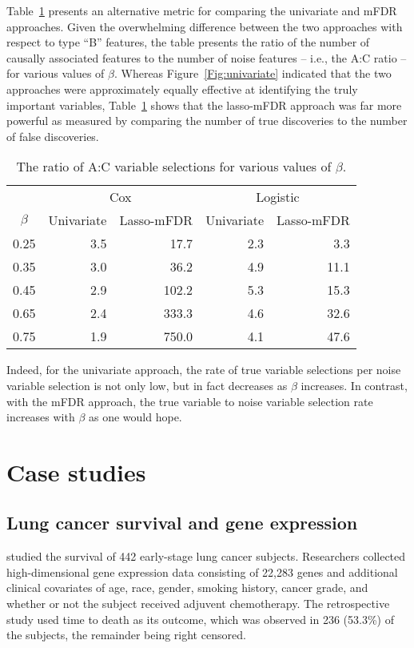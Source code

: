 Table~\ref{Tab:univariate} presents an alternative metric for comparing the univariate and mFDR approaches.  Given the overwhelming difference between the two approaches with respect to type ``B'' features, the table presents the ratio of the number of causally associated features to the number of noise features -- i.e., the A:C ratio -- for various values of $\beta$.  Whereas Figure~\ref{Fig:univariate} indicated that the two approaches were approximately equally effective at identifying the truly important variables, Table~\ref{Tab:univariate} shows that the lasso-mFDR approach was far more powerful as measured by comparing the number of true discoveries to the number of false discoveries.

\begin{table}[b!]
\centering
\begin{tabular}{c | r r r r}
  \hline
  & \multicolumn{2}{c}{Cox} & \multicolumn{2}{c}{Logistic}\\
 $\beta$ & Univariate & Lasso-mFDR & Univariate & Lasso-mFDR \\ 
  \hline
  0.25 & 3.5 & 17.7 & 2.3 & 3.3 \\ 
  0.35 & 3.0 & 36.2 & 4.9 & 11.1 \\ 
  0.45 & 2.9 & 102.2 & 5.3 & 15.3 \\ 
  0.65 & 2.4 & 333.3 & 4.6 & 32.6 \\ 
  0.75 & 1.9 & 750.0 & 4.1 & 47.6 \\ 
   \hline
\end{tabular}
\caption{\label{Tab:univariate} The ratio of A:C variable selections for various values of $\beta$.}
\end{table}

Indeed, for the univariate approach, the rate of true variable selections per noise variable selection is not only low, but in fact decreases as $\beta$ increases. In contrast, with the mFDR approach, the true variable to noise variable selection rate increases with $\beta$ as one would hope.

\section{Case studies}

\subsection{Lung cancer survival and gene expression}

\citet{Shedden2008} studied the survival of 442 early-stage lung cancer subjects. Researchers collected high-dimensional gene expression data consisting of 22,283 genes and additional clinical covariates of age, race, gender, smoking history, cancer grade, and whether or not the subject received adjuvent chemotherapy.  The retrospective study used time to death as its outcome, which was observed in 236 (53.3\%) of the subjects, the remainder being right censored.

